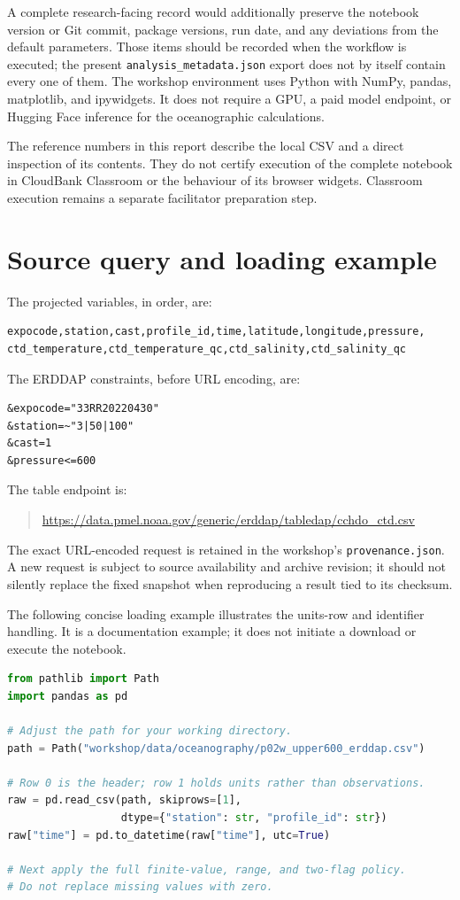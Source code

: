 \documentclass[11pt,letterpaper]{article}
\newcommand{\field}[1]{\nolinkurl{#1}}
\begin{document}
A complete research-facing record would additionally preserve the notebook version or Git commit, package versions, run date, and any deviations from the default parameters. Those items should be recorded when the workflow is executed; the present \field{analysis_metadata.json} export does not by itself contain every one of them. The workshop environment uses Python with NumPy, pandas, matplotlib, and ipywidgets. It does not require a GPU, a paid model endpoint, or Hugging Face inference for the oceanographic calculations.

The reference numbers in this report describe the local CSV and a direct inspection of its contents. They do not certify execution of the complete notebook in CloudBank Classroom or the behaviour of its browser widgets. Classroom execution remains a separate facilitator preparation step.

\appendix
\section{Source query and loading example}
\label{app:query}

The projected variables, in order, are:
\begin{lstlisting}
expocode,station,cast,profile_id,time,latitude,longitude,pressure,
ctd_temperature,ctd_temperature_qc,ctd_salinity,ctd_salinity_qc
\end{lstlisting}
The ERDDAP constraints, before URL encoding, are:
\begin{lstlisting}
&expocode="33RR20220430"
&station=~"3|50|100"
&cast=1
&pressure<=600
\end{lstlisting}
The table endpoint is:
\begin{quote}
\small\url{https://data.pmel.noaa.gov/generic/erddap/tabledap/cchdo_ctd.csv}
\end{quote}
The exact URL-encoded request is retained in the workshop's \field{provenance.json}. A new request is subject to source availability and archive revision; it should not silently replace the fixed snapshot when reproducing a result tied to its checksum.

The following concise loading example illustrates the units-row and identifier handling. It is a documentation example; it does not initiate a download or execute the notebook.
\begin{lstlisting}[language=Python]
from pathlib import Path
import pandas as pd

# Adjust the path for your working directory.
path = Path("workshop/data/oceanography/p02w_upper600_erddap.csv")

# Row 0 is the header; row 1 holds units rather than observations.
raw = pd.read_csv(path, skiprows=[1],
                  dtype={"station": str, "profile_id": str})
raw["time"] = pd.to_datetime(raw["time"], utc=True)

# Next apply the full finite-value, range, and two-flag policy.
# Do not replace missing values with zero.
\end{lstlisting}
\end{document}
